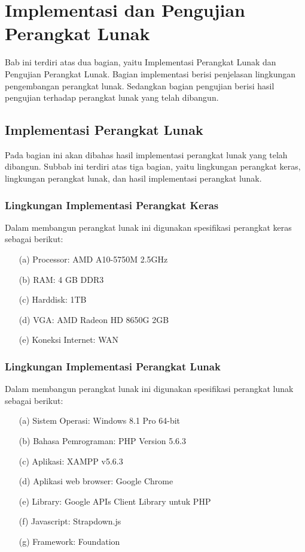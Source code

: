 \chapter{Implementasi dan Pengujian Perangkat Lunak}
\label{chap:implementasidanpengujian}

Bab ini terdiri atas dua bagian, yaitu Implementasi Perangkat Lunak dan
Pengujian Perangkat Lunak. Bagian implementasi berisi penjelasan lingkungan
pengembangan perangkat lunak. Sedangkan bagian pengujian berisi hasil pengujian
terhadap perangkat lunak yang telah dibangun.

\section{Implementasi Perangkat Lunak}
\label{sec:implementasiperangkatlunak}

Pada bagian ini akan dibahas hasil implementasi perangkat lunak yang telah
dibangun. Subbab ini terdiri atas tiga bagian, yaitu lingkungan perangkat keras,
lingkungan perangkat lunak, dan hasil implementasi perangkat lunak.

\subsection{Lingkungan Implementasi Perangkat Keras}
\label{sec:lingkunganimplementasiperangkatkeras}

Dalam membangun perangkat lunak ini digunakan spesifikasi perangkat keras
sebagai berikut:

\begin{enumerate}
\item[(a)] Processor: AMD A10-5750M 2.5GHz
\item[(b)] RAM: 4 GB DDR3
\item[(c)] Harddisk: 1TB
\item[(d)] VGA: AMD Radeon HD 8650G 2GB
\item[(e)] Koneksi Internet: WAN
\end{enumerate}

\subsection{Lingkungan Implementasi Perangkat Lunak}
\label{sec:lingkunganimplementasiperangkatlunak}

Dalam membangun perangkat lunak ini digunakan spesifikasi perangkat lunak
sebagai berikut:

\begin{enumerate}
\item[(a)] Sistem Operasi: Windows 8.1 Pro 64-bit
\item[(b)] Bahasa Pemrograman: PHP Version 5.6.3
\item[(c)] Aplikasi: XAMPP v5.6.3
\item[(d)] Aplikasi web browser: Google Chrome
\item[(e)] Library: Google APIs Client Library untuk PHP
\item[(f)] Javascript: Strapdown.js
\item[(g)] Framework: Foundation
\end{enumerate}

